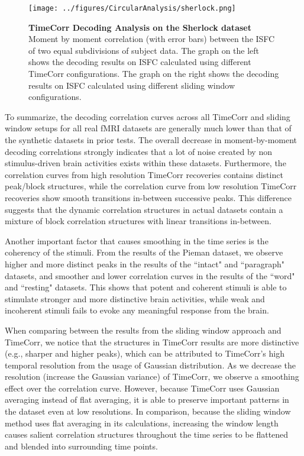 \documentclass[11pt]{article}
\begin{document}
\begin{figure}[!htb]
\texttt{[image: ../figures/CircularAnalysis/sherlock.png]}
\caption{\textbf{TimeCorr Decoding Analysis on the Sherlock dataset} Moment by moment correlation (with error bars) between the ISFC of two equal subdivisions of subject data. The graph on the left shows the decoding results on ISFC calculated using different TimeCorr configurations. The graph on the right shows the decoding results on ISFC calculated using different sliding window configurations.}
\label{fig:sherlock}
\end{figure}


To summarize, the decoding correlation curves across all TimeCorr and sliding window setups for all real fMRI datasets are generally much lower than that of the synthetic datasets in prior tests. The overall decrease in moment-by-moment decoding correlations strongly indicates that a lot of noise created by non stimulus-driven brain activities exists within these datasets. Furthermore, the correlation curves from high resolution TimeCorr recoveries contains distinct peak/block structures, while the correlation curve from low resolution TimeCorr recoveries show smooth transitions in-between successive peaks. This difference suggests that the dynamic correlation structures in actual datasets contain a mixture of block correlation structures with linear transitions in-between.

Another important factor that causes smoothing in the time series is the coherency of the stimuli. From the results of the Pieman dataset, we observe higher and more distinct peaks in the results of the ``intact" and ``paragraph" datasets, and smoother and lower correlation curves in the results of the  ``word" and ``resting" datasets. This shows that potent and coherent stimuli is able to stimulate stronger and more distinctive brain activities, while weak and incoherent stimuli fails to evoke any meaningful response from the brain.

When comparing between the results from the sliding window approach and TimeCorr, we notice that the structures in TimeCorr results are more distinctive (e.g., sharper and higher peaks), which can be attributed to TimeCorr's high temporal resolution from the usage of Gaussian distribution. As we decrease the resolution (increase the Gaussian variance) of TimeCorr, we observe a smoothing effect over the correlation curve. However, because TimeCorr uses Gaussian averaging instead of flat averaging, it is able to preserve important patterns in the dataset even at low resolutions. In comparison, because the sliding window method uses flat averaging in its calculations, increasing the window length causes salient correlation structures throughout the time series to be flattened and blended into surrounding time points.
\end{document}
